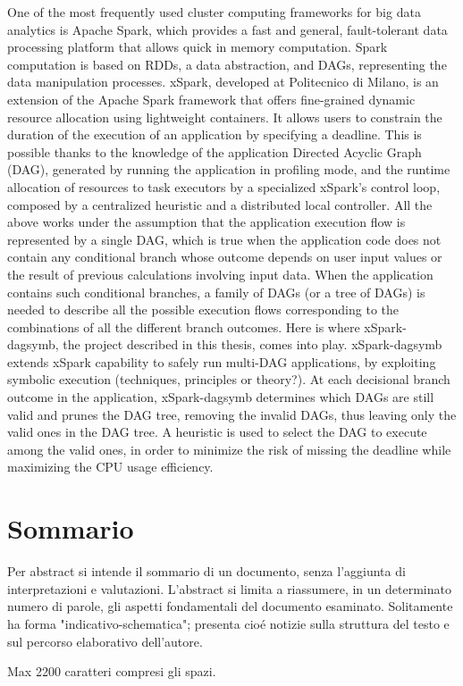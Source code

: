 One of the most frequently used cluster computing frameworks for big data analytics is Apache Spark, which provides a fast and general, fault-tolerant data processing platform that allows quick in memory computation. Spark computation is based on RDDs, a data abstraction, and DAGs, representing the data manipulation processes. xSpark, developed at Politecnico di Milano, is an extension of the Apache Spark framework that offers fine-grained dynamic resource allocation using lightweight containers. It allows users to constrain the duration of the execution of an application by specifying a deadline. This is possible thanks to the knowledge of the application Directed Acyclic Graph (DAG), generated by running the application in profiling mode, and the runtime allocation of resources to task executors by a specialized xSpark’s control loop, composed by a centralized heuristic and a distributed local controller. All the above works under the assumption that the application execution flow is represented by a single DAG, which is true when the application code does not contain any conditional branch whose outcome depends on user input values or the result of previous calculations involving input data. When the application contains such conditional branches, a family of DAGs (or a tree of DAGs) is needed to describe all the possible execution flows corresponding to the combinations of all the different branch outcomes. Here is where xSpark-dagsymb, the project described in this thesis, comes into play. xSpark-dagsymb extends xSpark capability to safely run multi-DAG applications, by exploiting symbolic execution (techniques, principles or theory?). At each decisional branch outcome in the application, xSpark-dagsymb determines which DAGs are still valid and prunes the DAG tree, removing the invalid DAGs, thus leaving only the valid ones in the DAG tree. A heuristic is used to select the DAG to execute among the valid ones, in order to minimize the risk of missing the deadline while maximizing the CPU usage efficiency.
\vfill
\newpage
{}
\chapter*{Sommario}
Per abstract si intende il sommario di un documento, senza l'aggiunta di interpretazioni e valutazioni. L'abstract si limita a riassumere, in un determinato numero di parole, gli aspetti fondamentali del documento esaminato. Solitamente ha forma "indicativo-schematica"; presenta cioé notizie sulla struttura del testo e sul percorso elaborativo dell'autore.

Max 2200 caratteri compresi gli spazi.

\endgroup